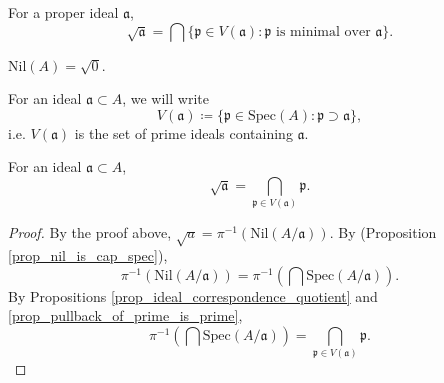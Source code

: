 \documentclass[12pt]{article}
\begin{document}
\begin{corollary}
	For a proper ideal $\mathfrak{a}$, 
	\begin{equation*}
		\sqrt{\mathfrak{a}} = \bigcap \{\mathfrak{p}\in V(\mathfrak{a}) : \mathfrak{p} \text{ is minimal over } \mathfrak{a} \}.
	\end{equation*}
\end{corollary}

\begin{example}
	$\text{Nil}(A)=\sqrt{0}$.
\end{example}

For an ideal $\mathfrak{a}\subset A$, we will write 
\begin{equation*}
	V(\mathfrak{a})\coloneqq \{\mathfrak{p}\in\text{Spec}(A) : \mathfrak{p}\supset\mathfrak{a} \},
\end{equation*}
i.e. $V(\mathfrak{a})$ is the set of prime ideals containing $\mathfrak{a}$. 

\begin{proposition}
	For an ideal $\mathfrak{a}\subset A$, 
	\begin{equation*}
		\sqrt{\mathfrak{a}} = \bigcap_{\mathfrak{p}\in V(\mathfrak{a})}\mathfrak{p}.
	\end{equation*}
\end{proposition}
\begin{proof}
	By the proof above, $\sqrt{a}=\pi^{-1}(\text{Nil}(A/\mathfrak{a}))$. By (Proposition \ref{prop_nil_is_cap_spec}), 
	\begin{equation*}
		\pi^{-1}(\text{Nil}(A/\mathfrak{a})) = \pi^{-1}(\bigcap\text{Spec}(A/\mathfrak{a})).
	\end{equation*}
	By Propositions \ref{prop_ideal_correspondence_quotient} and \ref{prop_pullback_of_prime_is_prime}, 
	\begin{equation*}
		\pi^{-1}(\bigcap\text{Spec}(A/\mathfrak{a})) = \bigcap_{\mathfrak{p}\in V(\mathfrak{a})}\mathfrak{p}.
	\end{equation*}
\end{proof}
\end{document}
